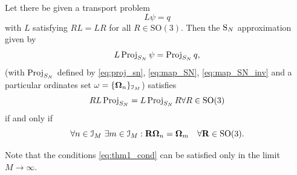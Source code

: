 \begin{theorem}\label{thm:commut_NTE}
Let there be given a transport problem 
$$
	L\psi = q
$$
with $L$ satisfying
$RL = LR$ for all $R\in\mathrm{SO}(3)$. 
Then the $\SN$ approximation given by
$$
\op{L}\Projop[S_N] \psi = \Projop[S_N] q,
$$
(with $\Projop[S_N]$ defined by \eqref{eq:proj_sn}, \eqref{eq:map_SN}, \eqref{eq:map_SN_inv} and a particular
ordinates set \mbox{$\omega = \{\bomega_n\}_{\idxset{M}}$}) satisfies
$$
\op{R}\op{L}\Projop[S_N] = \op{L}\Projop[S_N]\op{R} \forall R\in\mathrm{SO}(3)
$$
if and only if
\begin{equation}\label{eq:thm1_cond}
	\forall n\in \idxset{M}\ \exists m\in\idxset{M}: \mat{R}\bomega_n = \bomega_m \quad \forall \mat{R}\in\mathrm{SO}(3).
\end{equation} 
\end{theorem}
\begin{remark}
	Note that the conditions \eqref{eq:thm1_cond} can be satisfied only in the limit \mbox{$M\to\infty$}.
\end{remark}
